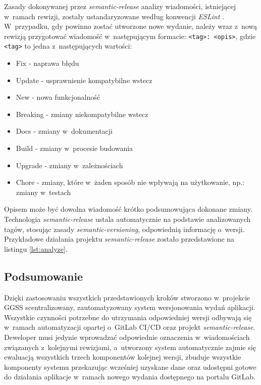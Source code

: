 Zasady dokonywanej przez \emph{semantic-release} analizy wiadomości, istniejącej w~ramach rewizji, zostały ustandaryzowane według konwencji \emph{ESLint} \cite{eslint}. W~przypadku, gdy powinno zostać utworzone nowe wydanie, należy wraz z~nową rewizją przygotować wiadomość w~następującym formacie: \lstinline{<tag>: <opis>}, gdzie \lstinline{<tag>} to jedna z~następujących wartości:
\begin{itemize}
    \item Fix - naprawa błędu
    \item Update - usprawnienie kompatybilne wstecz
    \item New - nowa funkcjonalność
    \item Breaking - zmiany niekompatybilne wstecz
    \item Docs - zmiany w~dokumentacji
    \item Build - zmiany w~procesie budowania
    \item Upgrade - zmiany w~zależnościach
    \item Chore - zmiany, które w~żaden sposób nie wpływają na użytkowanie, np.: zmiany w~testach
\end{itemize}
Opisem może być dowolna wiadomość krótko podsumowująca dokonane zmiany. Technologia \emph{semantic-release} ustala automatycznie na podstawie analizowanych tagów, stosując zasady \emph{semantic-versioning}, odpowiednią informację o~wersji. Przykładowe działania projektu \emph{semantic-release} zostało przedstawione na listingu \ref{lst:analyze}.



\subsection{Podsumowanie}
Dzięki zastosowaniu wszystkich przedstawionych kroków stworzono w~projekcie GGSS scentralizowany, zautomatyzowany system wersjonowania wydań aplikacji. Wszystkie czynności potrzebne do utrzymania odpowiedniej wersji odbywają się w~ramach automatyzacji opartej o~GitLab CI/CD oraz projekt \emph{semantic-release}. Deweloper musi jedynie wprowadzać odpowiednie oznaczenia w~wiadomościach związanych z~kolejnymi rewizjami, a~utworzony system automatycznie zajmie się ewaluacją wszystkich trzech komponentów kolejnej wersji, zbuduje wszystkie komponenty systemu przekazując wcześniej uzyskane dane oraz udostępni gotowe do działania aplikacje w~ramach nowego wydania dostępnego na portalu GitLab.
